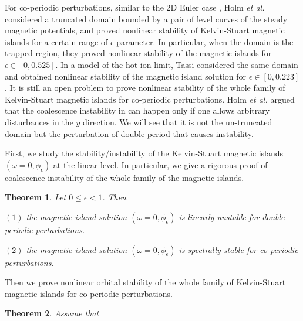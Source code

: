 \documentclass[1 [leqno, 11pt]{amsart}
\numberwithin{equation}{section}
\let\ep=\epsilon
\newtheorem{Theorem}{Theorem}[section]
\begin{document}
\begin{CJK*}{GBK}{song}
For  co-periodic perturbations,
similar to the 2D Euler case \cite{holm1986nonlinear},
Holm {\it et al.} \cite{holm1985nonlinear} considered a truncated domain bounded by a pair of level curves of the steady magnetic potentials,
and proved nonlinear stability of Kelvin-Stuart
   magnetic islands for a certain range of  $\ep$-parameter.
 In particular, when the domain is the trapped region, they proved
 nonlinear stability of the magnetic islands  for  $\ep\in[0,0.525]$.
  In a model of the hot-ion limit,
 Tassi \cite{Tassi2022} considered the  same domain and
    obtained nonlinear stability of
 the
   magnetic island solution
 for  $\ep\in[0,0.223]$.
 It is still an open problem to prove nonlinear  stability of the whole family of Kelvin-Stuart magnetic islands for co-periodic perturbations.
Holm {\it et al.} \cite{holm1985nonlinear} argued that the coalescence  instability in \cite{Finn-Kaw1977,Pritchett-Wu1979,Bondeson1983} can happen only if  one allows arbitrary disturbances
in the $y$ direction. We will see that it is not the un-truncated domain but the perturbation of double period that causes instability.


\medskip

First, we study the stability/instability of the Kelvin-Stuart magnetic islands  $(\omega=0,\phi_{\ep})$ at the linear level.
In particular, we give a rigorous proof of  coalescence instability of the whole family of the magnetic islands.



\begin{Theorem}\label{main result1-mhd-all1} Let $0 \leq \ep < 1$.  Then

$(1)$
 the  magnetic island solution $(\omega=0,\phi_{\ep})$ is linearly unstable for double-periodic perturbations.

$(2)$
 the  magnetic island solution $(\omega=0,\phi_{\ep})$  is spectrally stable for co-periodic perturbations.
\end{Theorem}

Then we prove nonlinear orbital  stability of the whole family of Kelvin-Stuart magnetic islands for co-periodic perturbations.




\begin{Theorem}\label{main result1-mhd-all}
 Assume that


\end{Theorem}
\end{CJK*}
\end{document}
